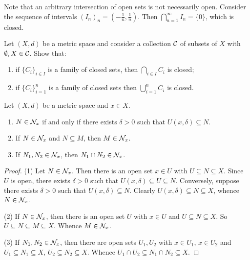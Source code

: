     Note that an arbitrary intersection of open sets is not necessarily open. Consider the sequence of intervals $(I_n)_n = (-\frac{1}{n},\frac{1}{n})$. Then $\bigcap_{n = 1}^\infty I_n = \{0\}$, which is closed.

    \begin{exercise}
        Let $(X,d)$ be a metric space and consider a collection $\mathcal{C}$ of subsets of $X$ with $\emptyset,X \in \mathcal{C}$. Show that:
            \begin{enumerate}[label = (\arabic*),itemsep=1pt,topsep=3pt]
                \item if $\{C_i\}_{i \in I}$ is a family of closed sets, then $\bigcap_{i \in I}C_i$ is closed;
                \item if $\{C_i\}_{i = 1}^n$ is a family of closed sets then $\bigcup_{i = 1}^n C_i$ is closed.
            \end{enumerate}
    \end{exercise}

    \begin{proposition}
        Let $(X,d)$ be a metric space and $x \in X$.
            \begin{enumerate}[label = (\arabic*),itemsep=1pt,topsep=3pt]
                \item $N \in \mathcal{N}_x$ if and only if there exists $\delta > 0$ such that $U(x,\delta) \subseteq N$.
                \item If $N \in \mathcal{N}_x$ and $N \subseteq M$, then $M \in \mathcal{N}_x$.
                \item If $N_1,N_2 \in \mathcal{N}_x$, then $N_1 \cap N_2 \in \mathcal{N}_x$.
            \end{enumerate}
    \end{proposition}
        \begin{proof}
            (1) Let $N \in \mathcal{N}_x$. Then there is an open set $x \in U$ with $U \subseteq N \subseteq X$. Since $U$ is open, there exists $\delta > 0$ such that $U(x,\delta) \subseteq U \subseteq N$. Conversely, suppose there exists $\delta >0$ such that $U(x,\delta) \subseteq N$. Clearly $U(x,\delta) \subseteq N \subseteq X$, whence $N \in \mathcal{N}_x$.

            (2) If $N \in \mathcal{N}_x$, then there is an open set $U$ with $x \in U$ and $U \subseteq N \subseteq X$. So $U \subseteq N \subseteq M \subseteq X$. Whence $M \in \mathcal{N}_x$.

            (3) If $N_1,N_2 \in \mathcal{N}_x$, then there are open sets $U_1,U_2$ with $x \in U_1$, $x \in U_2$ and $U_1 \subseteq N_1 \subseteq X$, $U_2 \subseteq N_2 \subseteq X$. Whence $U_1 \cap U_2 \subseteq N_1 \cap N_2 \subseteq X$.
        \end{proof}

